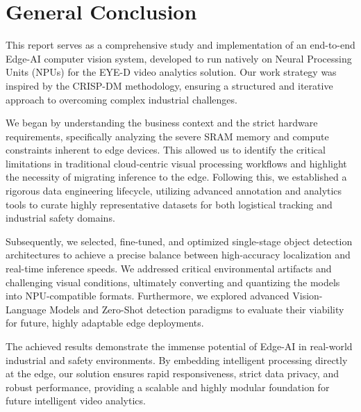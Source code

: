 \chapter*{General Conclusion}

This report serves as a comprehensive study and implementation of an end-to-end Edge-AI computer vision system, developed to run natively on Neural Processing Units (NPUs) for the EYE-D video analytics solution. Our work strategy was inspired by the CRISP-DM methodology, ensuring a structured and iterative approach to overcoming complex industrial challenges.

We began by understanding the business context and the strict hardware requirements, specifically analyzing the severe SRAM memory and compute constraints inherent to edge devices. This allowed us to identify the critical limitations in traditional cloud-centric visual processing workflows and highlight the necessity of migrating inference to the edge. Following this, we established a rigorous data engineering lifecycle, utilizing advanced annotation and analytics tools to curate highly representative datasets for both logistical tracking and industrial safety domains. 

Subsequently, we selected, fine-tuned, and optimized single-stage object detection architectures to achieve a precise balance between high-accuracy localization and real-time inference speeds. We addressed critical environmental artifacts and challenging visual conditions, ultimately converting and quantizing the models into NPU-compatible formats. Furthermore, we explored advanced Vision-Language Models and Zero-Shot detection paradigms to evaluate their viability for future, highly adaptable edge deployments.

The achieved results demonstrate the immense potential of Edge-AI in real-world industrial and safety environments. By embedding intelligent processing directly at the edge, our solution ensures rapid responsiveness, strict data privacy, and robust performance, providing a scalable and highly modular foundation for future intelligent video analytics.
